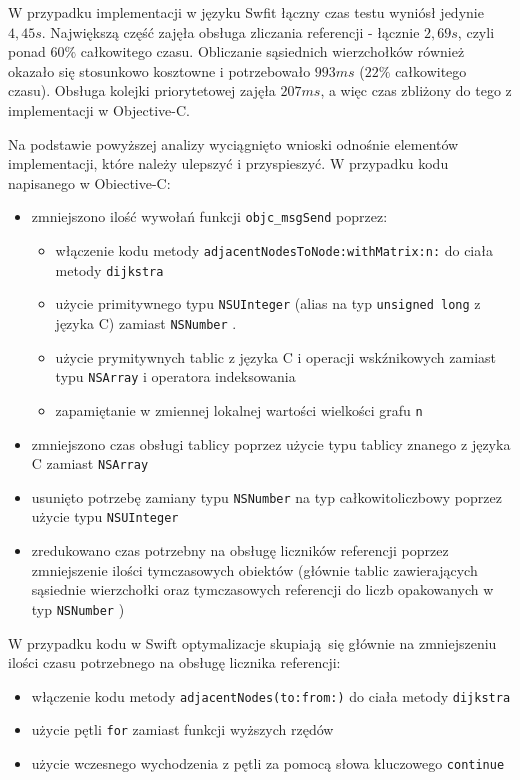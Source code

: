 \documentclass[mgr, shortabstract]{iithesis}
\newcommand{\swiftinline}[1]{
    \texttt{#1}
}
\newcommand{\objcinline}[1]{
    \texttt{#1}
}
\begin{document}
W przypadku implementacji w języku Swfit łączny czas testu wyniósł jedynie $4,45s$. Największą część zajęła obsługa zliczania referencji - łącznie $2,69s$, czyli ponad $60\%$ całkowitego czasu. Obliczanie sąsiednich wierzchołków również okazało się stosunkowo kosztowne i potrzebowało $993ms$ ($22\%$ całkowitego czasu). Obsługa kolejki priorytetowej zajęła $207ms$, a więc czas zbliżony do tego z implementacji w Objective-C.

Na podstawie powyższej analizy wyciągnięto wnioski odnośnie elementów implementacji, które należy ulepszyć i przyspieszyć. W przypadku kodu napisanego w Obiective-C:

\begin{itemize}
    \item zmniejszono ilość wywołań funkcji \objcinline{objc_msgSend} poprzez:
    \begin{itemize}
        \item włączenie kodu metody \objcinline{adjacentNodesToNode:withMatrix:n:} do ciała metody \objcinline{dijkstra}
        \item użycie primitywnego typu \objcinline{NSUInteger} (alias na typ \objcinline{unsigned long} z języka C) zamiast \objcinline{NSNumber}.
        \item użycie prymitywnych tablic z języka C i operacji wskźnikowych zamiast typu \objcinline{NSArray} i operatora indeksowania
        \item zapamiętanie w zmiennej lokalnej wartości wielkości grafu \objcinline{n}
    \end{itemize}
    \item zmniejszono czas obsługi tablicy poprzez użycie typu tablicy znanego z języka C zamiast \objcinline{NSArray}
    \item usunięto potrzebę zamiany typu \objcinline{NSNumber} na typ całkowitoliczbowy poprzez użycie typu \objcinline{NSUInteger}
    \item zredukowano czas potrzebny na obsługę liczników referencji poprzez zmniejszenie ilości tymczasowych obiektów (głównie tablic zawierających sąsiednie wierzchołki oraz tymczasowych referencji do liczb opakowanych w typ \objcinline{NSNumber})
\end{itemize}

W przypadku kodu w Swift optymalizacje skupiają się głównie na zmniejszeniu ilości czasu potrzebnego na obsługę licznika referencji:

\begin{itemize}
    \item włączenie kodu metody \swiftinline{adjacentNodes(to:from:)} do ciała metody \swiftinline{dijkstra}
    \item użycie pętli \swiftinline{for} zamiast funkcji wyższych rzędów
    \item użycie wczesnego wychodzenia z pętli za pomocą słowa kluczowego \swiftinline{continue}
\end{itemize}
\end{document}

